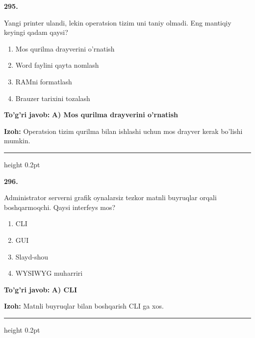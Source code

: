 \documentclass[10pt,a4paper]{article}
\begin{document}
{\bfseries\sffamily\color{ink} 295.}
\par
Yangi printer ulandi, lekin operatsion tizim uni taniy olmadi. Eng mantiqiy keyingi qadam qaysi?
\begin{enumerate}[label=\Alph*),leftmargin=9mm]
\item Mos qurilma drayverini o'rnatish
\item Word faylini qayta nomlash
\item RAMni formatlash
\item Brauzer tarixini tozalash
\end{enumerate}
\begin{tcolorbox}[enhanced,breakable,colback=teal!4,colframe=teal!60!black,boxrule=0.45pt,arc=1.2mm,left=2.7mm,right=2.7mm,top=1.8mm,bottom=1.8mm,before skip=2mm,after skip=2mm]
{\bfseries\sffamily\color{teal}To'g'ri javob:} \textbf{A) Mos qurilma drayverini o'rnatish}
\par\smallskip
{\bfseries Izoh:} Operatsion tizim qurilma bilan ishlashi uchun mos drayver kerak bo'lishi mumkin.
\end{tcolorbox}
\vspace{2mm}\hrule height 0.2pt\vspace{3mm}

{\bfseries\sffamily\color{ink} 296.}
\par
Administrator serverni grafik oynalarsiz tezkor matnli buyruqlar orqali boshqarmoqchi. Qaysi interfeys mos?
\begin{enumerate}[label=\Alph*),leftmargin=9mm]
\item CLI
\item GUI
\item Slayd-shou
\item WYSIWYG muharriri
\end{enumerate}
\begin{tcolorbox}[enhanced,breakable,colback=teal!4,colframe=teal!60!black,boxrule=0.45pt,arc=1.2mm,left=2.7mm,right=2.7mm,top=1.8mm,bottom=1.8mm,before skip=2mm,after skip=2mm]
{\bfseries\sffamily\color{teal}To'g'ri javob:} \textbf{A) CLI}
\par\smallskip
{\bfseries Izoh:} Matnli buyruqlar bilan boshqarish CLI ga xos.
\end{tcolorbox}
\vspace{2mm}\hrule height 0.2pt\vspace{3mm}
\end{document}
